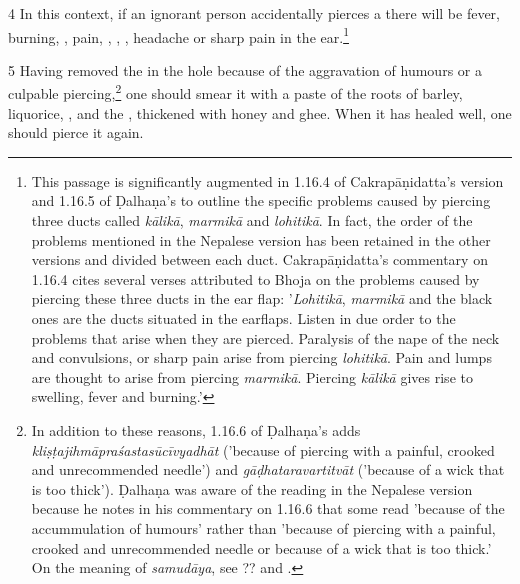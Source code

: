 \begin{translation}
    \item [4] In this context, if an ignorant person accidentally pierces a 
     there will 
    be fever, burning, , pain, , 
    , 
    , headache or sharp pain in the ear.\footnote{This passage is significantly augmented in 1.16.4 of Cakrapāṇidatta's version \citep[126]{acar-1939} and 1.16.5 of Ḍalhaṇa's \citep[77]{vulgate} to outline the specific problems caused by piercing three ducts called \emph{kālikā}, \emph{marmikā} and \emph{lohitikā}. In fact, the order of the problems mentioned in the Nepalese version has been retained in the other versions and divided between each duct. Cakrapāṇidatta's commentary on 1.16.4 \citep[126]{acar-1939} cites several verses attributed to Bhoja on the problems caused by piercing these three ducts in the ear flap: '\emph{Lohitikā}, \emph{marmikā} and the black ones are the ducts situated in the earflaps.  Listen in due order to the problems that arise when they are pierced. Paralysis of the nape of the neck and convulsions, or sharp pain arise from piercing \emph{lohitikā}. Pain and lumps are thought to arise from piercing \emph{marmikā}. Piercing \emph{kālikā} gives rise to swelling, fever and burning.'}
    
    \item[5]     Having removed the  in the hole because of the 
    aggravation of humours or a culpable piercing,\footnote{In addition to these 
    reasons, 1.16.6 of Ḍalhaṇa's \citep[77]{vulgate} adds
    \emph{kliṣṭajihmāpraśastasūcīvyadhāt} ('because of piercing with a painful, 
    crooked and unrecommended needle') and \emph{gāḍhataravartitvāt} 
    ('because of a wick that is too thick'). Ḍalhaṇa was aware of the reading in the 
    Nepalese version because he notes in his commentary on 1.16.6 
    \citep[77]{vulgate} that some read 'because of the accummulation of humours' 
    rather than 'because of piercing with a painful, crooked and unrecommended 
    needle or because of a wick that is too thick.' On the meaning of 
    \emph{samudāya}, see ?? and \cite[1–5]{meul-1992}.} one should smear it with
    a paste of the roots of 
    barley, 
    liquorice, 
    , and the
    ,
    thickened with honey and ghee. When it has healed well, one should pierce it again.
    

\end{translation}
